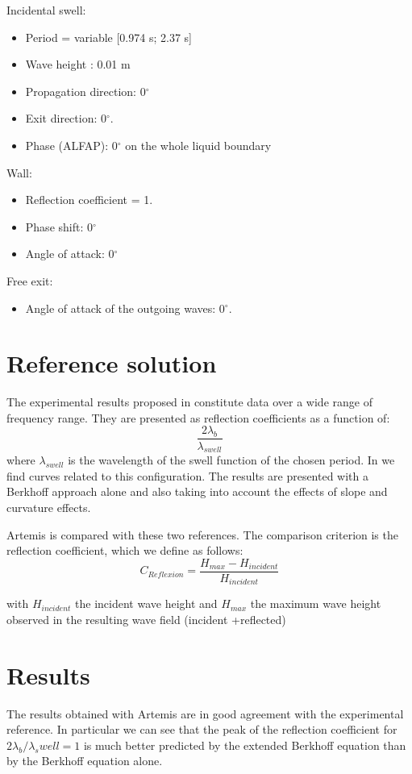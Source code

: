 Incidental swell:
\begin{itemize}
\item Period = variable [0.974 s; 2.37 s]
\item Wave height : 0.01 m
\item Propagation direction: 0$^\circ$
\item Exit direction: 0$^\circ$.
\item Phase (ALFAP): 0$^\circ$ on the whole liquid boundary
\end{itemize}
Wall:
\begin{itemize}
\item Reflection coefficient = 1.
\item Phase shift: 0$^\circ$
\item Angle of attack: 0$^\circ$
\end{itemize}
Free exit:
\begin{itemize}
\item Angle of attack of the outgoing waves: 0$^\circ$.
\end{itemize}

\section{Reference solution}
The experimental results proposed in \cite{davies1984} constitute data over a wide range of
frequency range. They are presented as reflection coefficients as a function of:
$$
\frac{2\lambda_b}{\lambda_{swell}}
$$
where $\lambda_{swell}$ is the wavelength of the swell function of the chosen period.
In \cite{Michel1999} we find curves related to this configuration. The results are presented
with a Berkhoff approach alone and also taking into account the effects of slope and
curvature effects.

Artemis is compared with these two references. The comparison criterion is the
reflection coefficient, which we define as follows:
$$
C_{Reflexion}=\frac{H_{max}-H_{incident}}{H_{incident}}
$$

with $H_{incident}$ the incident wave height and
$H_{max}$ the maximum wave height observed in the resulting wave field (incident
+reflected)

\section{Results}

The results obtained with Artemis are in good agreement with the experimental reference. 
In particular we can see that the peak of the reflection coefficient for $2\lambda_b /\lambda_swell = 1$ is much better predicted by the extended Berkhoff equation than by the Berkhoff equation alone.

